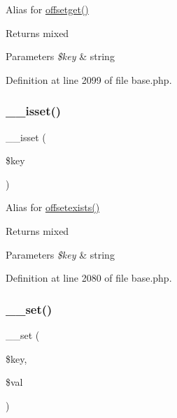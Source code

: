 Alias for \hyperlink{class_base_a4736f7355697c49bcd06b643b4077e8a}{offsetget()} \begin{DoxyReturn}{Returns}
mixed 
\end{DoxyReturn}

\begin{DoxyParams}{Parameters}
{\em \$key} & string \\
\hline
\end{DoxyParams}


Definition at line 2099 of file base.\+php.

\hypertarget{class_base_ae858fed7cd2822fbceac154138b68baa}{}\label{class_base_ae858fed7cd2822fbceac154138b68baa} 
\subsubsection{\texorpdfstring{\+\_\+\+\_\+isset()}{\_\_isset()}}
{\footnotesize\ttfamily \+\_\+\+\_\+isset (\begin{DoxyParamCaption}\item[{}]{\$key }\end{DoxyParamCaption})}

Alias for \hyperlink{class_base_a16da5af940f99a0df550a7f7c7c5d4e4}{offsetexists()} \begin{DoxyReturn}{Returns}
mixed 
\end{DoxyReturn}

\begin{DoxyParams}{Parameters}
{\em \$key} & string \\
\hline
\end{DoxyParams}


Definition at line 2080 of file base.\+php.

\hypertarget{class_base_ae5e0d9ea041c1957ef04189b0b29657c}{}\label{class_base_ae5e0d9ea041c1957ef04189b0b29657c} 
\subsubsection{\texorpdfstring{\+\_\+\+\_\+set()}{\_\_set()}}
{\footnotesize\ttfamily \+\_\+\+\_\+set (\begin{DoxyParamCaption}\item[{}]{\$key,  }\item[{}]{\$val }\end{DoxyParamCaption})}

